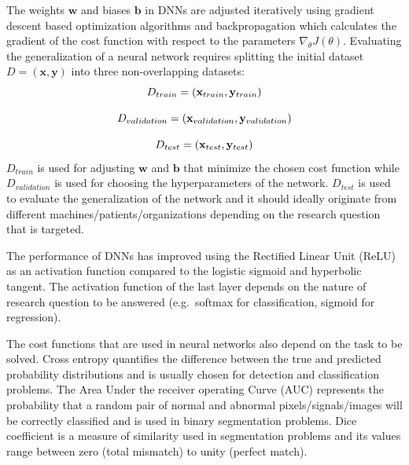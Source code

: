 \documentclass[journal]{IEEEtran}
\begin{document}
The weights $\mathbf{w}$ and biases $\mathbf{b}$ in DNNs are adjusted iteratively using gradient descent based optimization algorithms and backpropagation\cite{rumelhart1986learning} which calculates the gradient of the cost function with respect to the parameters $\nabla_{\theta}J(\theta)$\cite{goodfellow2016deep}.
Evaluating the generalization of a neural network requires splitting the initial dataset $D=(\mathbf{x}, \mathbf{y})$ into three non-overlapping datasets:
\begin{equation}
	\centering
	D_{train}=(\mathbf{x}_{train}, \mathbf{y}_{train})
\end{equation}

\begin{equation}
	\centering
	D_{validation}=(\mathbf{x}_{validation}, \mathbf{y}_{validation})
\end{equation}

\begin{equation}
	\centering
	D_{test}=(\mathbf{x}_{test}, \mathbf{y}_{test})
\end{equation}
$D_{train}$ is used for adjusting $\mathbf{w}$ and $\mathbf{b}$ that minimize the chosen cost function while $D_{validation}$ is used for choosing the hyperparameters of the network.
$D_{test}$ is used to evaluate the generalization of the network and it should ideally originate from different machines/patients/organizations depending on the research question that is targeted.

The performance of DNNs has improved using the Rectified Linear Unit (ReLU) as an activation function compared to the logistic sigmoid and hyperbolic tangent\cite{glorot2011deep}.
The activation function of the last layer depends on the nature of research question to be answered (e.g.\ softmax for classification, sigmoid for regression).

The cost functions that are used in neural networks also depend on the task to be solved.
Cross entropy quantifies the difference between the true and predicted probability distributions and is usually chosen for detection and classification problems.
The Area Under the receiver operating Curve (AUC) represents the probability that a random pair of normal and abnormal pixels/signals/images will be correctly classified\cite{hanley1982meaning} and is used in binary segmentation problems.
Dice coefficient\cite{dice1945measures} is a measure of similarity used in segmentation problems and its values range between zero (total mismatch) to unity (perfect match).
\end{document}
